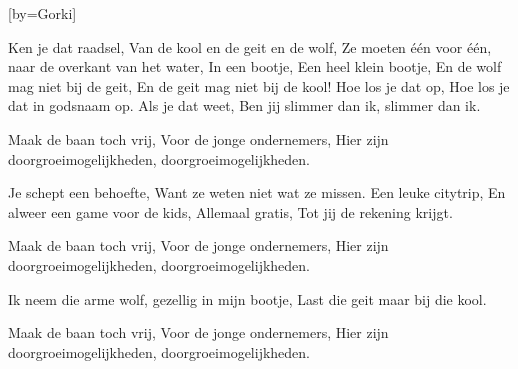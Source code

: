  

[by=Gorki]





\beginverse
Ken je dat raadsel, \brk Van de kool en de geit en de wolf,
Ze moeten \'e\'en voor \'e\'en, \brk naar de overkant van het water, 
In een bootje, \brk Een heel klein bootje, 
En de wolf mag niet bij de geit, \brk En de geit mag niet bij de kool! 
Hoe los je dat op, \brk Hoe los je dat in godsnaam op. 
Als je dat weet, \brk Ben jij slimmer dan ik, slimmer dan ik. 
\endverse

\beginchorus
Maak de baan toch vrij, \brk Voor de jonge ondernemers,
Hier zijn doorgroeimogelijkheden, doorgroeimogelijkheden. 
\endchorus

\beginverse
Je schept een behoefte, \brk Want ze weten niet wat ze missen. 
Een leuke citytrip, \brk En alweer een game voor de kids, 
Allemaal gratis, \brk Tot jij de rekening krijgt. 
\endverse

\beginchorus
{}
Maak de baan toch vrij, \brk Voor de jonge ondernemers,
Hier zijn doorgroeimogelijkheden, doorgroeimogelijkheden. 
\endchorus

\beginverse
Ik neem die arme wolf, \brk gezellig in mijn bootje, 
Last die geit maar bij die kool. 
\endverse

\beginchorus
{}
Maak de baan toch vrij, \brk Voor de jonge ondernemers,
Hier zijn doorgroeimogelijkheden, doorgroeimogelijkheden. 
\endchorus

\endsong
